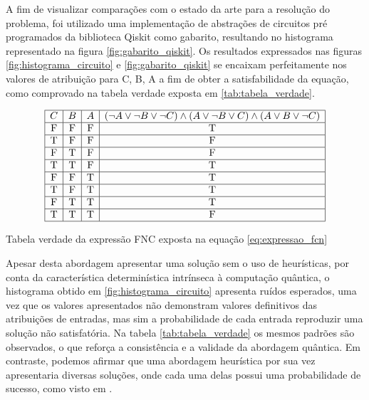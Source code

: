\documentclass[12pt]{article}
\begin{document}
A fim de visualizar comparações com o estado da arte para a resolução do problema, foi utilizado uma implementação de abstrações de circuitos pré programados da biblioteca Qiskit como gabarito, resultando no histograma representado na figura \ref{fig:gabarito_qiskit}. Os resultados expressados nas figuras  \ref{fig:histograma_circuito} e \ref{fig:gabarito_qiskit} se encaixam perfeitamente nos valores de atribuição para C, B, A a fim de obter a satisfabilidade da equação, como comprovado na tabela verdade exposta em \ref{tab:tabela_verdade}.

\begin{table}[h!]
\centering
\[
\begin{array}{|c|c|c|c|}
\hline
C & B & A & (\neg A \lor \neg B \lor \neg C) \land (A \lor \neg B \lor C) \land (A \lor B \lor \neg C) \\
\hline
\text{F} & \text{F} & \text{F} & \text{T} \\
\hline
\text{T} & \text{F} & \text{F} & \text{F} \\
\hline
\text{F} & \text{T} & \text{F} & \text{F} \\
\hline
\text{T} & \text{T} & \text{F} & \text{T} \\
\hline
\text{F} & \text{F} & \text{T} & \text{T} \\
\hline
\text{T} & \text{F} & \text{T} & \text{T} \\
\hline
\text{F} & \text{T} & \text{T} & \text{T} \\
\hline
\text{T} & \text{T} & \text{T} & \text{F} \\
\hline
\end{array}
\]
\caption{Tabela verdade da expressão FNC exposta na equação \ref{eq:expressao_fcn}}
\label{tab:tabela_verdade}
\end{table}
Apesar desta abordagem apresentar uma solução sem o uso de heurísticas, por conta da característica determinística intrínseca à computação quântica, o histograma obtido em \ref{fig:histograma_circuito} apresenta ruídos esperados, uma vez que os valores apresentados não demonstram valores definitivos das atribuições de entradas, mas sim a probabilidade de cada entrada reproduzir uma solução não satisfatória. Na tabela \ref{tab:tabela_verdade} os mesmos padrões são observados, o que reforça a consistência e a validade da abordagem quântica. Em contraste, podemos afirmar que uma abordagem heurística por sua vez apresentaria diversas soluções, onde cada uma delas possui uma probabilidade de sucesso, como visto em \cite{mandl:24}.
\end{document}
